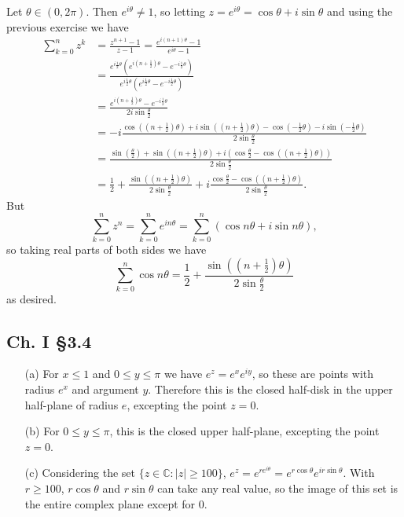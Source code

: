 \documentclass{article}
\begin{document}
Let $\theta \in (0, 2\pi)$. Then $e^{i\theta} \neq 1$,
so letting $z = e^{i \theta} = \cos \theta + i \sin \theta$ and using the
previous exercise we have
\begin{align*}
   \sum_{k=0}^n z^k
&= \frac{z^{n+1} - 1}{z - 1}
 = \frac{e^{i(n+1)\theta} - 1}{e^{i\theta} - 1} \\
&= \frac{e^{i\frac{1}{2}\theta}(e^{i(n+\frac{1}{2})\theta} - e^{-i\frac{1}{2}\theta})}
        {e^{i\frac{1}{2}\theta}(e^{i\frac{1}{2}\theta} - e^{-i\frac{1}{2}\theta})} \\
&= \frac{e^{i(n + \frac{1}{2})\theta} - e^{-i\frac{1}{2}\theta}}
        {2 i \sin \frac{\theta}{2}} \\
&= -i
    \frac{
      \cos((n + \frac{1}{2})\theta)
  + i \sin((n + \frac{1}{2})\theta)
  -   \cos(-\frac{1}{2}\theta)
  - i \sin(-\frac{1}{2}\theta)
    }
    {2 \sin \frac{\theta}{2}} \\
&=
  \frac{
    \sin(\frac{\theta}{2})
+   \sin ((n + \frac{1}{2})\theta)
+ i (\cos\frac{\theta}{2} - \cos((n + \frac{1}{2})\theta))
  }
  { 2 \sin \frac{\theta}{2} } \\
&= \frac{1}{2}
 + \frac{\sin ((n + \frac{1}{2})\theta)}
        { 2 \sin \frac{\theta}{2} }
 + i\frac{\cos\frac{\theta}{2} - \cos((n + \frac{1}{2})\theta)}
         { 2 \sin \frac{\theta}{2} }.
\end{align*}
But
$$
  \sum_{k=0}^n z^n
= \sum_{k=0}^n e^{i n \theta}
= \sum_{k=0}^n (\cos n \theta + i \sin n \theta),
$$
so taking real parts of both sides we have
$$
  \sum_{k=0}^n \cos n \theta
= \frac{1}{2}
+ \frac{\sin ((n + \frac{1}{2})\theta)}
       { 2 \sin \frac{\theta}{2} }
$$
as desired.

\subsection*{Ch. I \S 3.4}
\begin{itemize}
  \item[(a)]{
    For $x \leq 1$ and $0 \leq y \leq \pi$ we have
    $e^z = e^x e^{iy}$, so these are points with radius
    $e^x$ and argument $y$. Therefore this is the closed
    half-disk in the upper half-plane of radius $e$, excepting the point
    $z = 0$.
  }
  \item[(b)]{
    For $0 \leq y \leq \pi$, this is the closed upper half-plane, excepting
    the point $z = 0$.
  }
  \item[(c)]{
    Considering the set $\{ z \in \mathbb{C} : |z| \geq 100 \}$,
    $e^z = e^{r e^{i \theta}} = e^{r \cos \theta} e^{i r \sin \theta}$.
    With $r \geq 100$, $r \cos \theta$ and $r \sin \theta$
    can take any real value, so the image of this set is the entire
    complex plane except for 0.
  }
\end{itemize}
\end{document}
